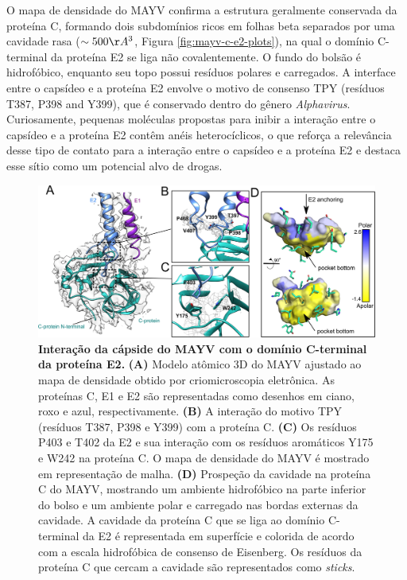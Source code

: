 \documentclass[Portugues]{phdquali}
\begin{document}
O mapa de densidade do MAYV confirma a estrutura geralmente conservada da proteína C, formando dois subdomínios ricos em folhas beta separados por uma cavidade rasa ($\sim500 \AA^3$, Figura \ref{fig:mayv-c-e2-plots}), na qual o domínio C-terminal da proteína E2 se liga não covalentemente. O fundo do bolsão é hidrofóbico, enquanto seu topo possui resíduos polares e carregados. A interface entre o capsídeo e a proteína E2 envolve o motivo de consenso TPY (resíduos T387, P398 and Y399), que é conservado dentro do gênero \textit{Alphavirus}. Curiosamente, pequenas moléculas propostas para inibir a interação entre o capsídeo e a proteína E2 contêm anéis heterocíclicos, o que reforça a relevância desse tipo de contato para a interação entre o capsídeo e a proteína E2 e destaca esse sítio como um potencial alvo de drogas.

\begin{figure}
  \centerline{\includegraphics[scale=0.2]{images/mayv-c-e2-analysis.png}}
  \caption[Interação da cápside do MAYV com o domínio C-terminal da proteína E2]{\textbf{Interação da cápside do MAYV com o domínio C-terminal da proteína E2.} \textbf{(A)} Modelo atômico 3D do MAYV ajustado ao mapa de densidade obtido por criomicroscopia eletrônica. As proteínas C, E1 e E2 são representadas como desenhos em ciano, roxo e azul, respectivamente. \textbf{(B)} A interação do motivo TPY (resíduos T387, P398 e Y399) com a proteína C. \textbf{(C)} Os resíduos P403 e T402 da E2 e sua interação com os resíduos aromáticos Y175 e W242 na proteína C. O mapa de densidade do MAYV é mostrado em representação de malha. \textbf{(D)} Prospeção da cavidade na proteína C do MAYV, mostrando um ambiente hidrofóbico na parte inferior do bolso e um ambiente polar e carregado nas bordas externas da cavidade. A cavidade da proteína C que se liga ao domínio C-terminal da E2 é representada em superfície e colorida de acordo com a escala hidrofóbica de consenso de Eisenberg. Os resíduos da proteína C que cercam a cavidade são representados como \textit{sticks}.}
  \label{fig:mayv-c-e2-analysis}
\end{figure}
\end{document}
